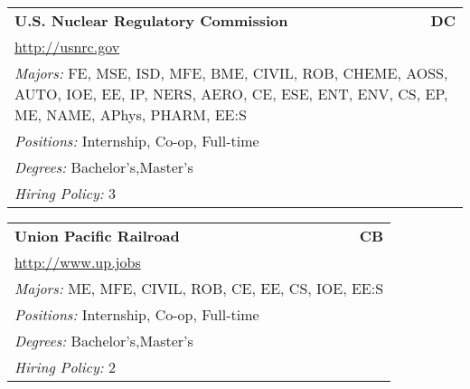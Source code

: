 \documentclass[twoside]{article}
\begin{document}
\begin{center}
\begin{multicols}{3}
\begin{FlushLeft}
\begin{minipage}{.9\columnwidth}
\end{minipage}
 
\begin{minipage}{.9\columnwidth}\begin{tabularx}{.95\columnwidth}{Xr}
                 {\Large\bf U.S. Nuclear Regulatory Commission} & {\Large\bf DC}\\
    \multicolumn{2}{p{.95\columnwidth}}{\url{http://usnrc.gov}}\\
    \multicolumn{2}{p{.95\columnwidth}}{\emph{Majors:} FE, MSE, ISD, MFE, BME, CIVIL, ROB, CHEME, AOSS, AUTO, IOE, EE, IP, NERS, AERO, CE, ESE, ENT, ENV, CS, EP, ME, NAME, APhys, PHARM, EE:S}\\
    \multicolumn{2}{p{.95\columnwidth}}{\emph{Positions:} Internship, Co-op, Full-time}\\
    \multicolumn{2}{p{.95\columnwidth}}{\emph{Degrees:} Bachelor's,Master's}\\
    \multicolumn{2}{p{.95\columnwidth}}{\emph{Hiring Policy:} 3}\\
    \end{tabularx}
    
\end{minipage}
 
\begin{minipage}{.9\columnwidth}\begin{tabularx}{.95\columnwidth}{Xr}
                 {\Large\bf Union Pacific Railroad} & {\Large\bf CB}\\
    \multicolumn{2}{p{.95\columnwidth}}{\url{http://www.up.jobs}}\\
    \multicolumn{2}{p{.95\columnwidth}}{\emph{Majors:} ME, MFE, CIVIL, ROB, CE, EE, CS, IOE, EE:S}\\
    \multicolumn{2}{p{.95\columnwidth}}{\emph{Positions:} Internship, Co-op, Full-time}\\
    \multicolumn{2}{p{.95\columnwidth}}{\emph{Degrees:} Bachelor's,Master's}\\
    \multicolumn{2}{p{.95\columnwidth}}{\emph{Hiring Policy:} 2}\\
    \end{tabularx}
    
\end{minipage}
 

\end{FlushLeft}
\end{multicols}
\end{center}
\end{document}
